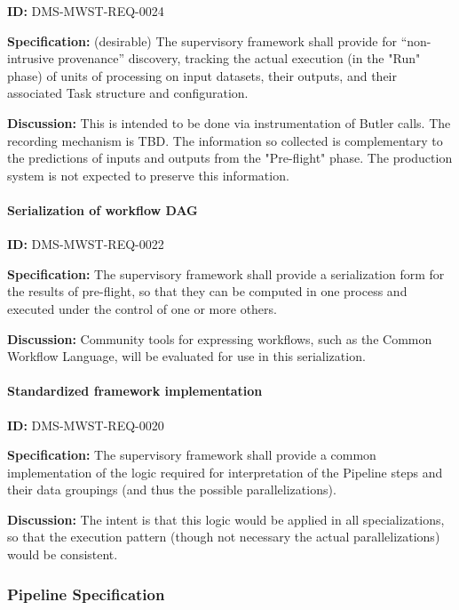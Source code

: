 \documentclass[SE,toc,lsstdraft]{lsstdoc}
\begin{document}
\label{DMS-MWST-REQ-0024}
\textbf{ID:} DMS-MWST-REQ-0024

\textbf{Specification:}
(desirable) The supervisory framework shall provide for “non-intrusive provenance” discovery, tracking the actual execution (in the "Run" phase) of units of processing on input datasets, their outputs, and their associated Task structure and configuration.

\textbf{Discussion:}
This is intended to be done via instrumentation of Butler calls. The recording mechanism is TBD. The information so collected is complementary to the predictions of inputs and outputs from the "Pre-flight" phase. The production system is not expected to preserve this information.

\paragraph{Serialization of workflow DAG}\hfill  %

\label{DMS-MWST-REQ-0022}
\textbf{ID:} DMS-MWST-REQ-0022

\textbf{Specification:}
The supervisory framework shall provide a serialization form for the results of pre-flight, so that they can be computed in one process and executed under the control of one or more others.

\textbf{Discussion:}
Community tools for expressing workflows, such as the Common Workflow Language, will be evaluated for use in this serialization.

\paragraph{Standardized framework implementation}\hfill  %

\label{DMS-MWST-REQ-0020}
\textbf{ID:} DMS-MWST-REQ-0020

\textbf{Specification:}
The supervisory framework shall provide a common implementation of the logic required for interpretation of the Pipeline steps and their data groupings (and thus the possible parallelizations).

\textbf{Discussion:}
The intent is that this logic would be applied in all specializations, so that the execution pattern (though not necessary the actual parallelizations) would be consistent.

\subsubsection{Pipeline Specification}
\end{document}
